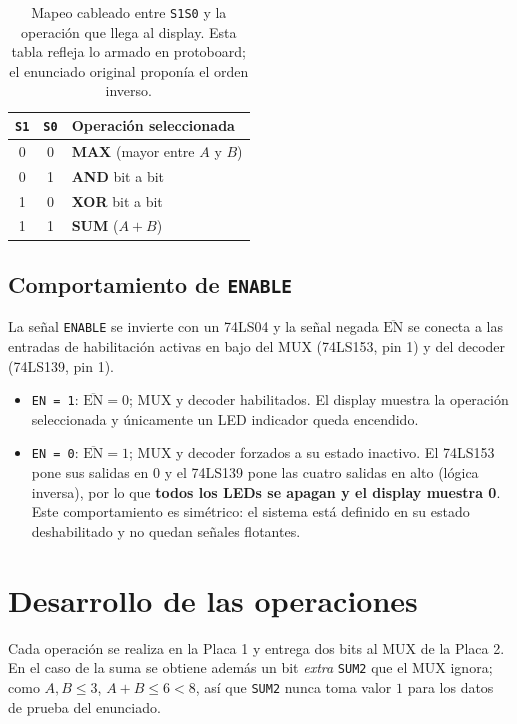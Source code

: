 \documentclass[a4paper,12pt]{article}
\begin{document}
\begin{table}[H]
\centering
\begin{tabular}{cc|l}
\toprule
\texttt{S1} & \texttt{S0} & Operaci\'{o}n seleccionada \\
\midrule
0 & 0 & \textbf{MAX} (mayor entre $A$ y $B$) \\
0 & 1 & \textbf{AND} bit a bit \\
1 & 0 & \textbf{XOR} bit a bit \\
1 & 1 & \textbf{SUM} ($A + B$) \\
\bottomrule
\end{tabular}
\caption{Mapeo cableado entre \texttt{S1S0} y la operaci\'{o}n que llega
al display. Esta tabla refleja lo armado en protoboard; el enunciado
original propon\'{i}a el orden inverso.}
\label{tab:smux}
\end{table}

\subsection{Comportamiento de \texttt{ENABLE}}
La se\~{n}al \texttt{ENABLE} se invierte con un 74LS04 y la se\~{n}al
negada \texttt{$\overline{\text{EN}}$} se conecta a las entradas de
habilitaci\'{o}n activas en bajo del MUX (74LS153, pin 1) y del decoder
(74LS139, pin 1).

\begin{itemize}[leftmargin=*, itemsep=2pt]
  \item \texttt{EN = 1}: \texttt{$\overline{\text{EN}} = 0$}; MUX y
        decoder habilitados. El display muestra la operaci\'{o}n
        seleccionada y \'{u}nicamente un LED indicador queda encendido.
  \item \texttt{EN = 0}: \texttt{$\overline{\text{EN}} = 1$}; MUX y
        decoder forzados a su estado inactivo. El 74LS153 pone sus
        salidas en 0 y el 74LS139 pone las cuatro salidas en alto (l\'{o}gica
        inversa), por lo que \textbf{todos los LEDs se apagan y el display
        muestra 0}. Este comportamiento es sim\'{e}trico: el sistema est\'{a}
        definido en su estado deshabilitado y no quedan se\~{n}ales
        flotantes.
\end{itemize}

\section{Desarrollo de las operaciones}
Cada operaci\'{o}n se realiza en la Placa 1 y entrega dos bits al MUX
de la Placa 2. En el caso de la suma se obtiene adem\'{a}s un bit
\textit{extra} \texttt{SUM2} que el MUX ignora; como $A, B \le 3$,
$A+B \le 6 < 8$, as\'{i} que \texttt{SUM2} nunca toma valor $1$ para
los datos de prueba del enunciado.
\end{document}
